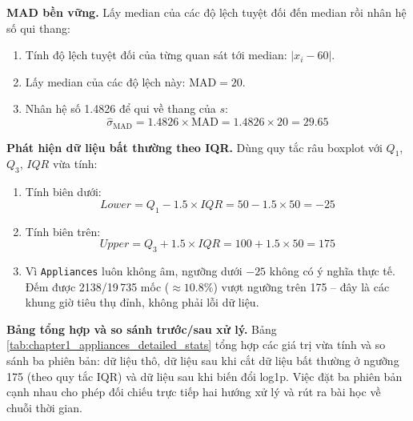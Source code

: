 \noindent\textbf{MAD bền vững.} Lấy median của các độ lệch tuyệt đối đến median rồi nhân hệ số qui thang:
\begin{enumerate}[leftmargin=2.2em,label=\textbf{\arabic*.}]
 \item Tính độ lệch tuyệt đối của từng quan sát tới median: $|x_i-60|$.
 \item Lấy median của các độ lệch này: $\text{MAD}=20$.
 \item Nhân hệ số 1.4826 để qui về thang của $s$:
 \begin{equation}
 \hat{\sigma}_{\text{MAD}} = 1.4826 \times \text{MAD} = 1.4826 \times 20 = 29.65
 \end{equation}
\end{enumerate}

\noindent\textbf{Phát hiện dữ liệu bất thường theo IQR.} Dùng quy tắc râu boxplot với $Q_1$, $Q_3$, $IQR$ vừa tính:
\begin{enumerate}[leftmargin=2.2em,label=\textbf{\arabic*.}]
 \item Tính biên dưới:
 \begin{equation}
 Lower = Q_1 - 1.5\times IQR = 50 - 1.5\times 50 = -25
 \end{equation}
 \item Tính biên trên:
 \begin{equation}
 Upper = Q_3 + 1.5\times IQR = 100 + 1.5\times 50 = 175
 \end{equation}
 \item Vì \texttt{Appliances} luôn không âm, ngưỡng dưới $-25$ không có ý nghĩa thực tế. Đếm được 2138/19\,735 mốc ($\approx10.8\%$) vượt ngưỡng trên 175 -- đây là các khung giờ tiêu thụ đỉnh, không phải lỗi dữ liệu.
\end{enumerate}

\noindent\textbf{Bảng tổng hợp và so sánh trước/sau xử lý.} Bảng \ref{tab:chapter1_appliances_detailed_stats} tổng hợp các giá trị vừa tính và so sánh ba phiên bản: dữ liệu thô, dữ liệu sau khi cắt dữ liệu bất thường ở ngưỡng 175 (theo quy tắc IQR) và dữ liệu sau khi biến đổi log1p. Việc đặt ba phiên bản cạnh nhau cho phép đối chiếu trực tiếp hai hướng xử lý và rút ra bài học về chuỗi thời gian.

